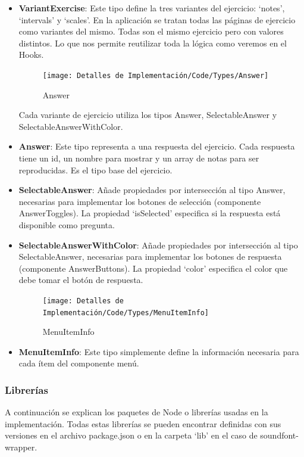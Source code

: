 \documentclass[12pt,twoside,titlepage]{report}
\begin{document}
\begin{itemize}
    \item \textbf{VariantExercise}: Este tipo define la tres variantes del ejercicio: ‘notes’, ‘intervals’ y ‘scales’. En la aplicación se tratan todas las páginas de ejercicio como variantes del mismo. Todas son el mismo ejercicio pero con valores distintos. Lo que nos permite reutilizar toda la lógica como veremos en el Hooks.

    \begin{figure}[H]
        \centering
        \texttt{[image: Detalles de Implementación/Code/Types/Answer]}
        \label{fig:Answer}
        \caption{Answer}
    \end{figure}

    Cada variante de ejercicio utiliza los tipos Answer, SelectableAnswer y SelectableAnswerWithColor. 

    \item \textbf{Answer}: Este tipo representa a una respuesta del ejercicio. Cada respuesta tiene un id, un nombre para mostrar y un array de notas para ser reproducidas. Es el tipo base del ejercicio.
    \item \textbf{SelectableAnswer}: Añade propiedades por intersección al tipo Answer, necesarias para implementar los botones de selección (componente AnswerToggles). La propiedad ‘isSelected’ especifica si la respuesta está disponible como pregunta.
    \item \textbf{SelectableAnswerWithColor}: Añade propiedades por intersección al tipo SelectableAnswer, necesarias para implementar los botones de respuesta (componente AnswerButtons). La propiedad ‘color’ especifica el color que debe tomar el botón de respuesta.

    \begin{figure}[H]
        \centering
        \texttt{[image: Detalles de Implementación/Code/Types/MenuItemInfo]}
        \label{fig:MenuItemInfo}
        \caption{MenuItemInfo}
    \end{figure}

    \item \textbf{MenuItemInfo}: Este tipo simplemente define la información necesaria para cada ítem del componente menú.
\end{itemize}

\subsubsection{Librerías}
A continuación se explican los paquetes de Node o librerías usadas en la implementación. Todas estas librerías se pueden encontrar definidas con sus versiones en el archivo package.json o en la carpeta ‘lib’ en el caso de soundfont-wrapper.
\end{document}
